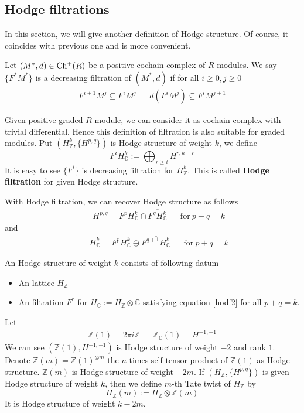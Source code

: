 \documentclass[11pt,oneside,a4paper]{amsbook}
\begin{document}
\subsection{Hodge filtrations}
In this section, we will give another definition of Hodge structure. Of course, it coincides with previous one and is more convenient.
\begin{secdefn}
	Let $(M^*,d) \in \operatorname*{Ch^{+}}(R)$ be a positive cochain complex of $R$-modules. We say $\{F^*M^*\}$ is a decreasing filtration of $(M^*,d)$ if for all $i \geq 0 , j \geq 0$
	\[
	\begin{aligned}
	F^{i+1}M^j \subseteq F^{i}M^j& & d(F^iM^j) \subseteq F^iM^{j+1}
	\end{aligned}
	\]
\end{secdefn}
Given positive graded $R$-module, we can consider it as cochain complex with trivial differential. Hence this definition of filtration is also suitable for graded modules. Put $(H_\mathbb{Z}^k, \{H^{p,q}\})$ is Hodge structure of weight $k$, we define
\begin{equation}
	F^iH_{\mathbb{C}}^k:= \bigoplus_{r \geq i}H^{r,k-r}
\end{equation}
It is easy to see $\{F^i\}$ is decreasing filtration for $H_{\mathbb{Z}}^k$. This is called \textbf{Hodge filtration} for given Hodge structure.

With Hodge filtration, we can recover Hodge structure as follows
\begin{align}
	\label{hodf1}
	& &H^{p,q}= F^{p}H_{\mathbb{C}}^k \cap \overline{F^q H_{\mathbb{C}}^k} && \text{for}\ p+q=k
\end{align}
and 
\begin{align}
	\label{hodf2}
	& &H_\mathbb{C}^k= F^p H^k_\mathbb{C} \oplus  \overline{F^{q+1}H^k_{\mathbb{C}}}& &\text{for}\ p+q=k
\end{align}

\begin{secdefn}
	An Hodge structure of weight $k$ consists of following datum
	\begin{itemize}
		\item An lattice $H_\mathbb{Z}$
		\item An filtration $F^*$ for $H_\mathbb{C}:= H_\mathbb{Z} \otimes \mathbb{C}$ satisfying equation \ref{hodf2} for all $p+q=k$.
	\end{itemize}
\end{secdefn}

\begin{ex}
	Let 
	\begin{align}
		\mathbb{Z}(1)= 2\pi i \mathbb{Z}& & \mathbb{Z}_{\mathbb{C}}(1)= H^{-1,-1}
	\end{align}
	We can see $(\mathbb{Z}(1), H^{-1,-1})$ is Hodge structure of weight $-2$ and rank $1$. Denote $\mathbb{Z}(m)= \mathbb{Z}(1)^{\otimes m}$ the $n$   times self-tensor product of $\mathbb{Z}(1)$ as Hodge structure. $\mathbb{Z}(m)$ is Hodge structure of weight $-2m$. If $(H_\mathbb{Z}, \{ H^{p,q}\})$ is given Hodge structure of weight $k$, then we define $m$-th Tate twist of $H_\mathbb{Z}$ by
	\[
	H_\mathbb{Z}(m):= H_\mathbb{Z} \otimes \mathbb{Z}(m)
	\] 
	It is Hodge structure of weight $k-2m$. 
\end{ex}
\end{document}
